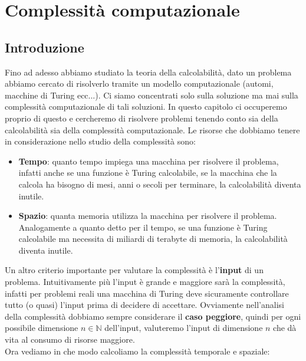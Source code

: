\chapter{Complessità computazionale}
\section{Introduzione}
Fino ad adesso abbiamo studiato la teoria della calcolabilità, dato un problema abbiamo cercato di risolverlo 
tramite un modello computazionale (automi, macchine di Turing ecc...). Ci siamo concentrati solo sulla soluzione 
ma mai sulla complessità computazionale di tali soluzioni. In questo capitolo ci occuperemo proprio di questo e cercheremo di 
risolvere problemi tenendo conto sia della calcolabilità sia della complessità computazionale.
Le risorse che dobbiamo tenere in considerazione nello studio della complessità sono:
\begin{itemize}
    \item \textbf{Tempo}: quanto tempo impiega una macchina per risolvere il problema, infatti anche se una
    funzione è Turing calcolabile, se la macchina che la calcola ha bisogno di mesi, anni o secoli per terminare, la calcolabilità diventa inutile.

    \item \textbf{Spazio}: quanta memoria utilizza la macchina per risolvere il problema. Analogamente a quanto detto 
    per il tempo, se una funzione è Turing calcolabile ma necessita di miliardi di terabyte di memoria, la calcolabilità diventa inutile.
\end{itemize}
Un altro criterio importante per valutare la complessità è l'\textbf{input} di un problema. Intuitivamente
più l'input è grande e maggiore sarà la complessità, infatti per problemi reali una macchina di Turing 
deve sicuramente controllare tutto (o quasi) l'input prima di decidere di accettare. Ovviamente nell'analisi della
complessità dobbiamo sempre considerare il \textbf{caso peggiore}, quindi per ogni possibile dimensione $n \in \mathbb{N}$
dell'input, valuteremo l'input di dimensione $n$ che dà vita al consumo di risorse maggiore.\\
Ora vediamo in che modo calcoliamo la complessità temporale e spaziale:
